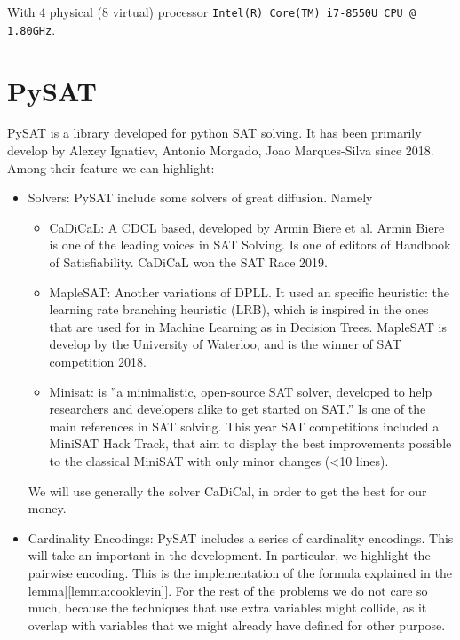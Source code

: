   With 4 physical (8 virtual) processor \texttt{Intel(R) Core(TM) i7-8550U CPU @ 1.80GHz}. 

  
\section{PySAT}
PySAT\cite{imms-sat18} is a library developed for python SAT solving. It has been primarily develop by Alexey Ignatiev, Antonio Morgado, Joao Marques-Silva since 2018. Among their feature we can highlight:

\begin{itemize}
\item Solvers:  PySAT include some solvers of great diffusion. Namely
  \begin{itemize}
  \item CaDiCaL: A CDCL based, developed by Armin Biere et al. Armin Biere is one of the leading voices in SAT Solving. Is one of editors of Handbook of Satisfiability. CaDiCaL won the SAT Race 2019.
  \item MapleSAT: Another variations of DPLL. It used an specific heuristic: the learning rate branching heuristic (LRB), which is inspired in the ones that are used for in Machine Learning as in Decision Trees. MapleSAT is develop by the University of Waterloo, and is the winner of SAT competition 2018.
  \item Minisat: is ''a minimalistic, open-source SAT solver, developed to help researchers and developers alike to get started on SAT.'' Is one of the main references in SAT solving. This year SAT competitions included a MiniSAT Hack Track, that aim to display the best improvements possible to the classical MiniSAT with only minor changes (<10 lines).
  \end{itemize}

  We will use generally the solver CaDiCal, in order to get the best for our money.
  
\item Cardinality Encodings: PySAT includes a series of cardinality encodings. This will take an important in the development. In particular, we highlight the pairwise encoding. This is the implementation of the formula explained in the lemma[\ref{lemma:cooklevin}]. For the rest of the problems we do not care so much, because the techniques that use extra variables might collide, as it overlap with variables that we might already have defined for other purpose.

\end{itemize}


